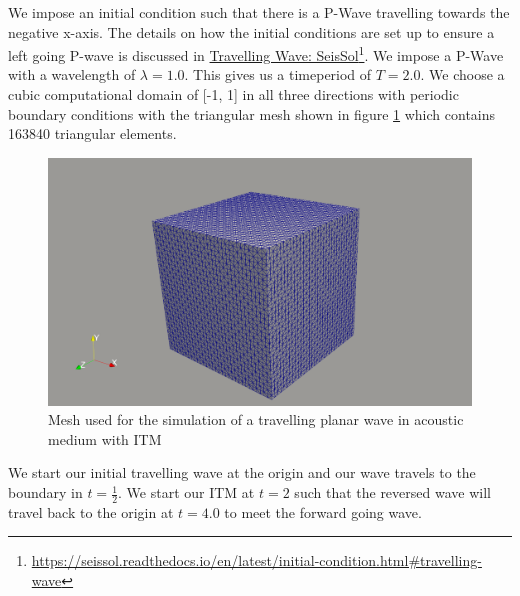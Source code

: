 We impose an initial condition such that there is a P-Wave travelling towards the negative x-axis. The details on how the initial conditions are set up to ensure a left going P-wave is discussed in
\href{https://seissol.readthedocs.io/en/latest/initial-condition.html#travelling-wave}{Travelling Wave: SeisSol}\footnote{\href{https://seissol.readthedocs.io/en/latest/initial-condition.html\#travelling-wave}{https://seissol.readthedocs.io/en/latest/initial-condition.html\#travelling-wave}}. We impose a P-Wave with a wavelength of 
$\lambda = 1.0$. This gives us a timeperiod of $T=2.0$. We choose a cubic computational domain of [-1, 1] in all three directions with periodic boundary conditions with the triangular mesh shown in figure \ref{fig:acoustic_mesh} which contains
163840 triangular elements. 

\begin{figure}[htpb]
    \centering
    \includegraphics[width=0.85\linewidth]{figures/mesh_cube.png}
    \caption{Mesh used for the simulation of a travelling planar wave in acoustic medium with \ac{ITM}}
    \label{fig:acoustic_mesh}
\end{figure}
\par We start our initial travelling wave at the origin and our wave travels to the boundary in $t = \frac{1}{2}$. We start our \ac{ITM} at $t=2$ such that the reversed wave will travel back to the origin at $t=4.0$ to meet the
forward going wave. 

